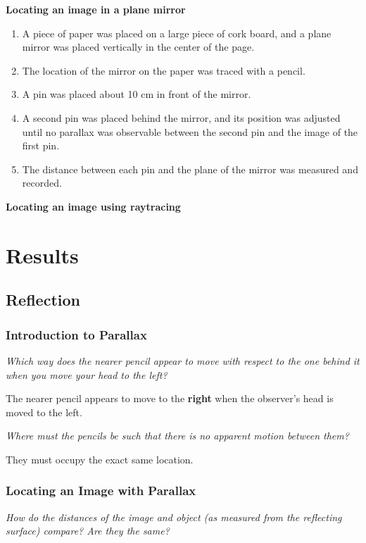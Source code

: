 \documentclass[twocolumn,english]{IEEEtran}
\theoremstyle{plain}
\theoremstyle{plain}
\begin{document}
\textbf{Locating an image in a plane mirror}
\begin{enumerate}
 \item A piece of paper was placed on a large piece of cork board, and a plane mirror was placed vertically in the center of the page.
 \item The location of the mirror on the paper was traced with a pencil.
 \item A pin was placed about 10 cm in front of the mirror.
 \item A second pin was placed behind the mirror, and its position was adjusted until no parallax was observable between the second pin and the image of the first pin.
 \item The distance between each pin and the plane of the mirror was measured and recorded.
\end{enumerate}

\textbf{Locating an image using raytracing}



\section{Results}
\subsection{\textbf{Reflection}}

\subsubsection{Introduction to Parallax}


\noindent\textit{Which way does the nearer pencil appear to move with respect to the one behind it when you move your head to the left?}

The nearer pencil appears to move to the \textbf{right} when the observer's head is moved to the left.

\noindent\textit{Where must the pencils be such that there is no apparent motion between them?}

They must occupy the exact same location.

\subsubsection{Locating an Image with Parallax}


\noindent\textit{How do the distances of the image and object (as measured from the reflecting surface) compare? Are they the same?}
\end{document}
